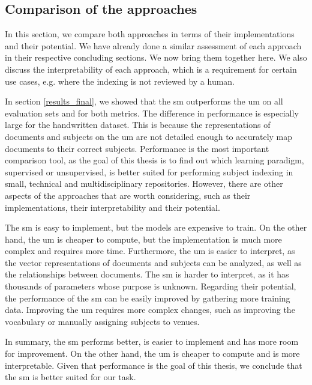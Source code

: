 \subsection{Comparison of the approaches}

In this section, we compare both approaches in terms of their implementations and their potential. We have already done a similar assessment of each approach in their respective concluding sections. We now bring them together here. We also discuss the interpretability of each approach, which is a requirement for certain use cases, e.g. where the indexing is not reviewed by a human.

In section \ref{results_final}, we showed that the \acrfull{sm} outperforms the \acrshort{um} on all evaluation sets and for both metrics. The difference in performance is especially large for the handwritten dataset. This is because the representations of documents and subjects on the \acrshort{um} are not detailed enough to accurately map documents to their correct subjects. Performance is the most important comparison tool, as the goal of this thesis is to find out which learning paradigm, supervised or unsupervised, is better suited for performing subject indexing in small, technical and multidisciplinary repositories. However, there are other aspects of the approaches that are worth considering, such as their implementations, their interpretability and their potential.

The \acrshort{sm} is easy to implement, but the models are expensive to train. On the other hand, the \acrshort{um} is cheaper to compute, but the implementation is much more complex and requires more time. Furthermore, the \acrshort{um} is easier to interpret, as the vector representations of documents and subjects can be analyzed, as well as the relationships between documents. The \acrshort{sm} is harder to interpret, as it has thousands of parameters whose purpose is unknown. Regarding their potential, the performance of the \acrshort{sm} can be easily improved by gathering more training data. Improving the \acrshort{um} requires more complex changes, such as improving the vocabulary or manually assigning subjects to venues.

In summary, the \acrshort{sm} performs better, is easier to implement and has more room for improvement. On the other hand, the \acrshort{um} is cheaper to compute and is more interpretable. Given that performance is the goal of this thesis, we conclude that the \acrshort{sm} is better suited for our task.

